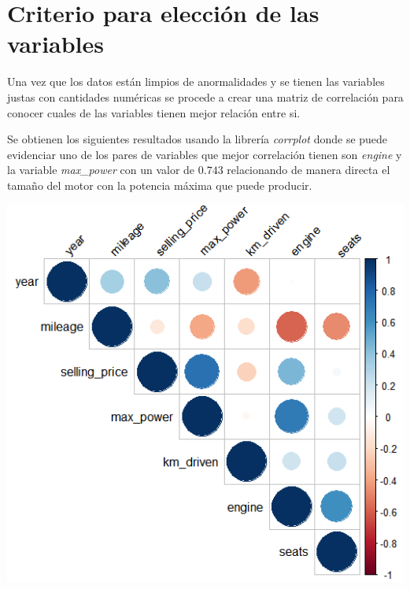 \documentclass{article}
\begin{document}
\section{Criterio para elección de las variables}
Una vez que los datos están limpios de anormalidades y se tienen las variables justas con cantidades numéricas se procede a crear una matriz de correlación para conocer cuales de las variables tienen mejor relación entre si.\par

Se obtienen los siguientes resultados usando la librería \textit{corrplot} donde se puede evidenciar uno de los pares de variables que mejor correlación tienen son \textit{engine} y la variable \textit{max\_power} con un valor de \(0.743\) relacionando de manera directa el tamaño del motor con la potencia máxima que puede producir.\par

\includegraphics[scale=0.55, trim={0cm 0cm 0cm 0cm}, clip]{graphs/conclusion1.png}
\end{document}
